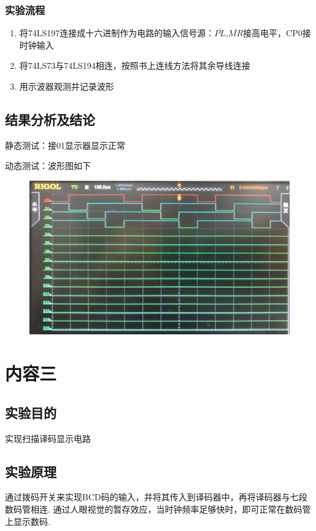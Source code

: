 \documentclass[11pt,UTF8]{ctexart}
\begin{document}
\subsubsection{实验流程}
\begin{enumerate}
    \item 将74LS197连接成十六进制作为电路的输入信号源：$\overline{PL}$,$\overline{MR}$接高电平，CP0接时钟输入
    \item 将74LS73与74LS194相连，按照书上连线方法将其余导线连接
    \item 用示波器观测并记录波形
\end{enumerate}

\subsection{结果分析及结论}
\par 静态测试：接01显示器显示正常
\par 动态测试：波形图如下
\begin{figure}[H]
    \centering
    \includegraphics[width=0.9\linewidth]{fig/wave2.PNG}
\end{figure}


\section{内容三}
\subsection{实验目的}
实现扫描译码显示电路

\subsection{实验原理}
通过拨码开关来实现BCD码的输入，并将其传入到译码器中，再将译码器与七段数码管相连. 通过人眼视觉的暂存效应，当时钟频率足够快时，即可正常在数码管上显示数码.
\end{document}
